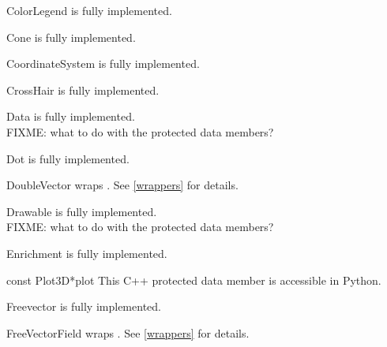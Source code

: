 \documentclass{manual}
\begin{document}
\begin{classdesc*}{ColorLegend}
  is fully implemented.
\end{classdesc*}

\begin{classdesc*}{Cone}
  is fully implemented.
\end{classdesc*}

\begin{classdesc*}{CoordinateSystem}
  is fully implemented.
\end{classdesc*}

\begin{classdesc*}{CrossHair}
  is fully implemented.
\end{classdesc*}

\begin{classdesc*}{Data}
  is fully implemented.\\
  FIXME: what to do with the protected data members?
\end{classdesc*}

\begin{classdesc*}{Dot}
  is fully implemented.
\end{classdesc*}

\begin{classdesc*}{DoubleVector}
  wraps . See \ref{wrappers} for details.
\end{classdesc*}

\begin{classdesc*}{Drawable}
  is fully implemented.\\
  FIXME: what to do with the protected data members?
\end{classdesc*}

\begin{classdesc*}{Enrichment}
  is fully implemented.\\
  \begin{cvardesc}{const Plot3D*}{plot}
    This C++ protected data member is accessible in Python.
  \end{cvardesc}
\end{classdesc*}

\begin{classdesc*}{Freevector}
  is fully implemented.
\end{classdesc*}

\begin{classdesc*}{FreeVectorField}
  wraps . See \ref{wrappers} for details.
\end{classdesc*}
\end{document}
